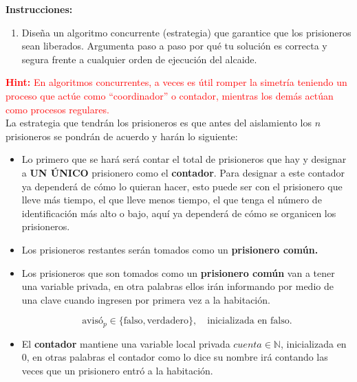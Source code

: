    \textcolor{azul}{\textbf{Instrucciones:}}

    \begin{enumerate}
        \item \textcolor{dkgreen}{Diseña un algoritmo concurrente (estrategia) que garantice que los prisioneros sean liberados. Argumenta paso a paso por qué tu solución es correcta y segura frente a cualquier orden de ejecución del alcaide.}
    \end{enumerate}

    \textcolor{red}{\textbf{Hint:} En algoritmos concurrentes, a veces es útil romper la simetría teniendo un proceso que actúe como ``coordinador'' o contador, mientras los demás actúan como procesos regulares.}\\

    La estrategia que tendrán los prisioneros es que antes del aislamiento los $n$ prisioneros se pondrán de acuerdo y harán lo siguiente:

    \begin{itemize}
        \item Lo primero que se hará será contar el total de prisioneros que hay y designar a \textbf{UN ÚNICO} prisionero como el \textbf{contador}. Para designar a este contador ya dependerá de cómo lo quieran hacer, esto puede ser con el prisionero que lleve más tiempo, el que lleve menos tiempo, el que tenga el número de identificación más alto o bajo, aquí ya dependerá de cómo se organicen los prisioneros.

        \item Los prisioneros restantes serán tomados como un \textbf{prisionero común. }

        \item Los prisioneros que son tomados como un \textbf{prisionero común} van a tener una variable privada, en otra palabras ellos irán informando por medio de una clave cuando ingresen por primera vez a la habitación.

        \[
        \text{avis\'o}_p \in \{\text{falso}, \text{verdadero}\}, \quad \text{inicializada en } \text{falso}.
    \]

    \item El \textbf{contador} mantiene una variable local privada $\textit{cuenta} \in \mathbb{N}$, inicializada en $0$, en otras palabras el contador como lo dice su nombre irá contando las veces que un prisionero entró a la habitación.
    
    \end{itemize}

